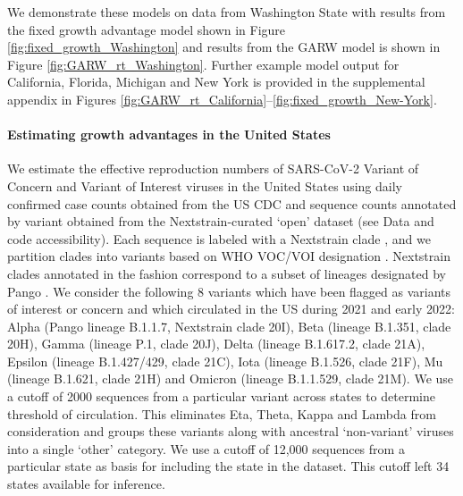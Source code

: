 We demonstrate these models on data from Washington State with results from the fixed growth advantage model shown in Figure \ref{fig:fixed_growth_Washington} and results from the GARW model is shown in Figure \ref{fig:GARW_rt_Washington}.
Further example model output for California, Florida, Michigan and New York is provided in the supplemental appendix in Figures \ref{fig:GARW_rt_California}--\ref{fig:fixed_growth_New-York}.

\paragraph{Estimating growth advantages in the United States}

We estimate the effective reproduction numbers of SARS-CoV-2 Variant of Concern and Variant of Interest viruses in the United States using daily confirmed case counts obtained from the US CDC and sequence counts annotated by variant obtained from the Nextstrain-curated `open' dataset \cite{Hadfield2018} (see Data and code accessibility).
Each sequence is labeled with a Nextstrain clade \cite{Hadfield2018}, and we partition clades into variants based on WHO VOC/VOI designation \cite{Konings2021}.
Nextstrain clades annotated in the fashion correspond to a subset of lineages designated by Pango \cite{Rambaut2020}.
We consider the following 8 variants which have been flagged as variants of interest or concern and which circulated in the US during 2021 and early 2022: Alpha (Pango lineage B.1.1.7, Nextstrain clade 20I), Beta (lineage B.1.351, clade 20H), Gamma (lineage P.1, clade 20J), Delta (lineage B.1.617.2, clade 21A), Epsilon (lineage B.1.427/429, clade 21C), Iota (lineage B.1.526, clade 21F), Mu (lineage B.1.621, clade 21H) and Omicron (lineage B.1.1.529, clade 21M).
We use a cutoff of 2000 sequences from a particular variant across states to determine threshold of circulation.
This eliminates Eta, Theta, Kappa and Lambda from consideration and groups these variants along with ancestral `non-variant' viruses into a single `other' category.
We use a cutoff of 12,000 sequences from a particular state as basis for including the state in the dataset.
This cutoff left 34 states available for inference.

